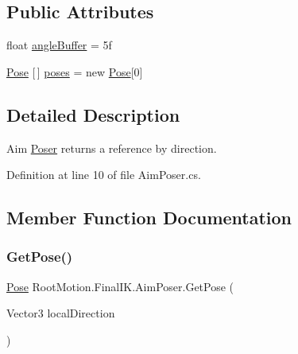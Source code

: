 \subsection*{Public Attributes}
\begin{DoxyCompactItemize}
\item 
float \mbox{\hyperlink{class_root_motion_1_1_final_i_k_1_1_aim_poser_a5b51cba6cf04c2983261e550f1ef7a72}{angle\+Buffer}} = 5f
\item 
\mbox{\hyperlink{class_root_motion_1_1_final_i_k_1_1_aim_poser_1_1_pose}{Pose}} \mbox{[}$\,$\mbox{]} \mbox{\hyperlink{class_root_motion_1_1_final_i_k_1_1_aim_poser_a84ae0b6317b0209189ff41317a968bce}{poses}} = new \mbox{\hyperlink{class_root_motion_1_1_final_i_k_1_1_aim_poser_1_1_pose}{Pose}}\mbox{[}0\mbox{]}
\end{DoxyCompactItemize}


\subsection{Detailed Description}
Aim \mbox{\hyperlink{class_root_motion_1_1_final_i_k_1_1_poser}{Poser}} returns a reference by direction. 



Definition at line 10 of file Aim\+Poser.\+cs.



\subsection{Member Function Documentation}
\mbox{\label{class_root_motion_1_1_final_i_k_1_1_aim_poser_a2e38d4b0d15b8076dd44e5a08890504a}} 
\subsubsection{\texorpdfstring{Get\+Pose()}{GetPose()}}
{\footnotesize\ttfamily \mbox{\hyperlink{class_root_motion_1_1_final_i_k_1_1_aim_poser_1_1_pose}{Pose}} Root\+Motion.\+Final\+I\+K.\+Aim\+Poser.\+Get\+Pose (\begin{DoxyParamCaption}\item[{Vector3}]{local\+Direction }\end{DoxyParamCaption})}



